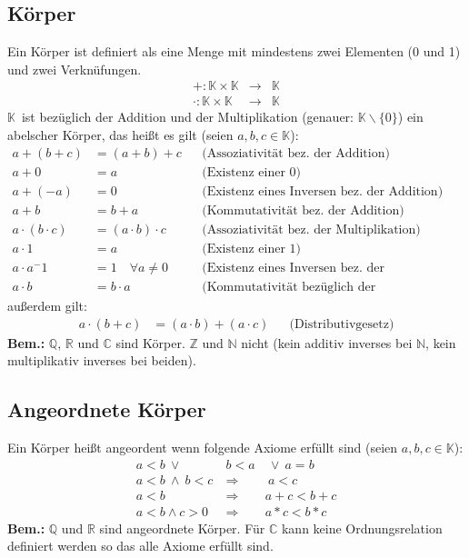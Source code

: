 \documentclass[10pt]{article}
\newcommand{\K}{$\mathbb{K}$}
\newcommand{\N}{\mathbb{N}}
\newcommand{\Z}{\mathbb{Z}}
\newcommand{\Q}{\mathbb{Q}}
\newcommand{\R}{\mathbb{R}}
\newcommand{\C}{\mathbb{C}}
\begin{document}
    \subsection{Körper}
    Ein Körper ist definiert als eine Menge mit mindestens zwei Elementen
    (0 und 1) und zwei Verknüfungen.
    \begin{eqnarray*}
        +: \mathbb{K} \times \mathbb{K} &\rightarrow& \mathbb{K}\\
        \cdot: \mathbb{K} \times \mathbb{K} &\rightarrow& \mathbb{K}
    \end{eqnarray*}
    \K\ ist bezüglich der Addition und der Multiplikation (genauer: $\mathbb{K} \backslash \{0\}$) ein abelscher
    Körper, das heißt es gilt (seien $a,b,c \in \mathbb{K}$):
    \begin{align*}
        a + (b + c) &= (a + b) + c &&\text{(Assoziativität bez.\ der Addition)}\\
        a + 0 &= a &&\text{(Existenz einer 0)}\\
        a + (-a) &= 0 &&\text{(Existenz eines Inversen bez.\ der Addition)}\\
        a + b &= b + a &&\text{(Kommutativität bez.\ der Addition)}\\
        a \cdot (b \cdot c) &= (a \cdot b) \cdot c &&\text{(Assoziativität bez.\ der Multiplikation)}\\
        a \cdot 1 &= a &&\text{(Existenz einer 1)}\\
        a \cdot a^-1 &= 1\quad \forall a \neq 0 &&\text{(Existenz eines Inversen bez.\ der Multiplikation)}\\
        a \cdot b &= b \cdot a &&\text{(Kommutativität bezüglich der Multiplikation)}
    \end{align*}
    außerdem gilt:
    \begin{align*}
        a \cdot (b + c) &= (a \cdot b) + (a \cdot c) &&\text{(Distributivgesetz)}
    \end{align*}
    \textbf{Bem.:}
    $\Q$, $\R$ und $\C$ sind Körper.
    $\Z$ und $\N$ nicht (kein additiv inverses bei $\N$,
    kein multiplikativ inverses bei beiden).


    \subsection{Angeordnete Körper}
    Ein Körper heißt angeordent wenn folgende Axiome erfüllt sind
    (seien $a,b,c \in \mathbb{K}$):
    \begin{eqnarray*}
        a<b\ \vee\ &b<a&\ \vee\ a=b\\
        a<b\ \wedge\ b<c\ &\Rightarrow&\ a<c\\
        a<b &\Rightarrow& a+c<b+c\\
        a<b \wedge c>0 &\Rightarrow& a*c<b*c
    \end{eqnarray*}
    \textbf{Bem.:}
    $\Q$ und $\R$ sind angeordnete Körper. Für $\C$
    kann keine Ordnungsrelation definiert werden so das alle Axiome erfüllt
    sind.
\end{document}
